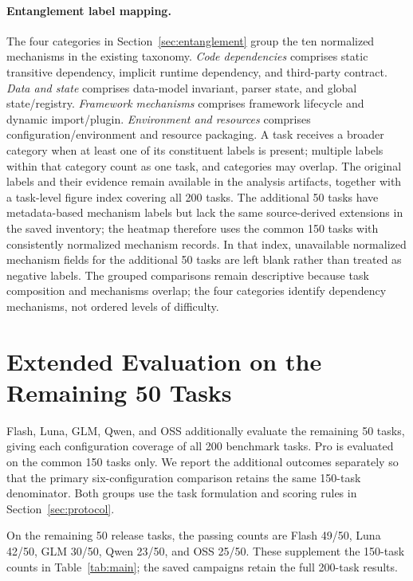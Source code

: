 \documentclass[acmsmall,screen,review,anonymous,nonacm]{acmart}
\begin{document}
\paragraph{Entanglement label mapping.}
\label{app:entanglement-mapping}
The four categories in Section~\ref{sec:entanglement} group the ten normalized
mechanisms in the existing taxonomy. \emph{Code dependencies} comprises static
transitive dependency, implicit runtime dependency, and third-party contract.
\emph{Data and state} comprises data-model invariant, parser state, and global
state/registry. \emph{Framework mechanisms} comprises framework lifecycle and
dynamic import/plugin. \emph{Environment and resources} comprises
configuration/environment and resource packaging. A task receives a broader
category when at least one of its constituent labels is present; multiple
labels within that category count as one task, and categories may overlap.
The original labels and their evidence remain available in the analysis
artifacts, together with a task-level figure index covering all 200 tasks.
The additional 50 tasks have metadata-based mechanism labels but lack the
same source-derived extensions in the saved inventory; the heatmap therefore
uses the common 150 tasks with consistently normalized mechanism records.
In that index, unavailable normalized mechanism fields for the additional
50 tasks are left blank rather than treated as negative labels.
The grouped comparisons remain descriptive because task composition and
mechanisms overlap; the four categories identify dependency mechanisms,
not ordered levels of difficulty.

\section{Extended Evaluation on the Remaining 50 Tasks}
\label{app:extension}

Flash, Luna, GLM, Qwen, and OSS additionally evaluate the remaining 50 tasks,
giving each configuration coverage of all 200 benchmark tasks. Pro is
evaluated on the common 150 tasks only. We report the additional outcomes
separately so that the primary six-configuration comparison retains the same
150-task denominator. Both groups use the task formulation and scoring rules
in Section~\ref{sec:protocol}.

On the remaining 50 release tasks, the passing counts are Flash 49/50, Luna 42/50, GLM 30/50, Qwen 23/50, and OSS 25/50. These supplement the 150-task counts in Table~\ref{tab:main}; the saved campaigns retain the full 200-task results.
\end{document}
